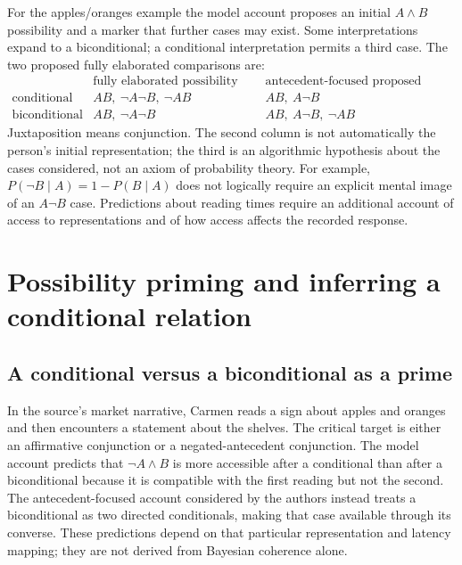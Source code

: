 For the apples/oranges example the model account proposes an initial
\(A\land B\) possibility and a marker that further cases may exist.
Some interpretations expand to a biconditional; a conditional
interpretation permits a third case. The two proposed fully elaborated
comparisons are:
\[
\begin{array}{c|l|l}
 &\text{fully elaborated possibility reading}
 &\text{antecedent-focused proposed comparisons}\\\hline
 \text{conditional}&AB,\ \neg A\neg B,\ \neg AB
                   &AB,\ A\neg B\\
 \text{biconditional}&AB,\ \neg A\neg B
                     &AB,\ A\neg B,\ \neg AB
\end{array}
\]
Juxtaposition means conjunction. The second column is not automatically
the person's initial representation; the third is an algorithmic hypothesis
about the cases considered, not an axiom of probability theory.
For example, \(P(\neg B\mid A)=1-P(B\mid A)\) does not logically
require an explicit mental image of an \(A\neg B\) case.
Predictions about reading times require an additional account of access
to representations and of how access affects the recorded response.

\section{Possibility priming and inferring a conditional relation}
\label{sec:p19-rat63-factual-evidence}

\subsection{A conditional versus a biconditional as a prime}

In the source's market narrative, Carmen reads a sign about apples and
oranges and then encounters a statement about the shelves. The critical
target is either an affirmative conjunction or a negated-antecedent
conjunction. The model account predicts that \(\neg A\land B\)
is more accessible after a conditional than after a biconditional because
it is compatible with the first reading but not the second. The
antecedent-focused account considered by the authors instead treats a
biconditional as two directed conditionals, making that case available
through its converse. These predictions depend on that particular
representation and latency mapping; they are not derived from Bayesian
coherence alone.
\cite[Sec.~2.1, pp.~407--409]{ByrneEspino2021ConditionalCounterfactual}

